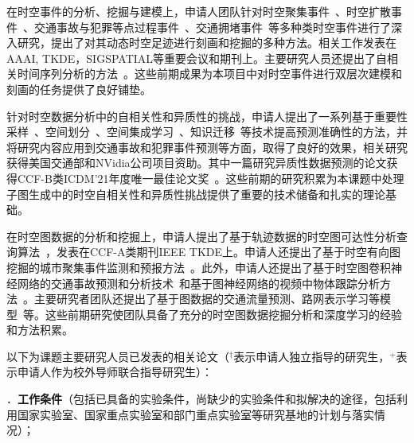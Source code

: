\documentclass[12pt,UTF8,AutoFakeBold=2,a4paper]{ctexart} %
\renewcommand{\refname}{\sihao \kaishu \leftline{参考文献}} %
\newcommand{\sihao}{\fontsize{14pt}{\baselineskip}\selectfont}
\begin{document}
\begin{bibunit}
在时空事件的分析、挖掘与建模上，申请人团队针对时空聚集事件~\cite{vahedian2017forecasting,zhou2016traffic,khezerlou2017traffic,khezerlou2019forecasting}、时空扩散事件~\cite{vahedian2019predicting,khezerlou2021dilsa+}、交通事故与犯罪等点过程事件~\cite{an2024spatialrank}、交通拥堵事件~\cite{xiong2023detecting}等多种类时空事件进行了深入研究，提出了对其动态时空足迹进行刻画和挖掘的多种方法。相关工作发表在AAAI, TKDE，SIGSPATIAL等重要会议和期刊上。主要研究人员还提出了自相关时间序列分析的方法~\cite{liu2022multivariate}。这些前期成果为本项目中对时空事件进行双层次建模和刻画的任务提供了良好铺垫。

针对时空数据分析中的自相关性和异质性的挑战，申请人提出了一系列基于重要性采样~\cite{an2024spatialrank}、空间划分~\cite{yuan2018hetero,xie2021spatial}、空间集成学习~\cite{xie2022statistically}、知识迁移~\cite{an2022hintnet}等技术提高预测准确性的方法，并将研究内容应用到交通事故和犯罪事件预测等方面，取得了良好的效果，相关研究获得美国交通部和NVidia公司项目资助。其中一篇研究异质性数据预测的论文获得CCF-B类ICDM'21年度唯一最佳论文奖~\cite{xie2021statistically}。这些前期的研究积累为本课题中处理子图生成中的时空自相关性和异质性挑战提供了重要的技术储备和扎实的理论基础。

在时空图数据的分析和挖掘上，申请人提出了基于轨迹数据的时空图可达性分析查询算法~\cite{ding2019mining}，发表在CCF-A类期刊IEEE TKDE上。申请人还提出了基于时空有向图挖掘的城市聚集事件监测和预报方法~\cite{zhou2016traffic,khezerlou2017traffic}。此外，申请人还提出了基于时空图卷积神经网络的交通事故预测和分析技术~\cite{an2022hintnet}和基于图神经网络的视频中物体跟踪分析方法~\cite{ding2022egospeed}。主要研究者团队还提出了基于图数据的交通流量预测、路网表示学习等模型~\cite{li2020spatial,guo2021learning,chen2021robust}等。这些前期研究使团队具备了充分的时空图数据挖掘分析和深度学习的经验和方法积累。

以下为课题主要研究人员已发表的相关论文（$^\dagger$表示申请人独立指导的研究生，$^{+}$表示申请人作为校外导师联合指导研究生）：
\patchcmd{\thebibliography}{\section*{\refname}}{}{}{}
  {\settowidth}
{\setlength{\parsep}{0pt}\setlength{\itemsep}{0pt plus 0.1pt}\settowidth}
  {}{}


{
\small
\putbib[mywork]
}
\end{bibunit}
{\sihao \color{MsBlue} ．{\bfseries 工作条件}（包括已具备的实验条件，尚缺少的实验条件和拟解决的途径，包括利用国家实验室、国家重点实验室和部门重点实验室等研究基地的计划与落实情况）；}
\end{document}
